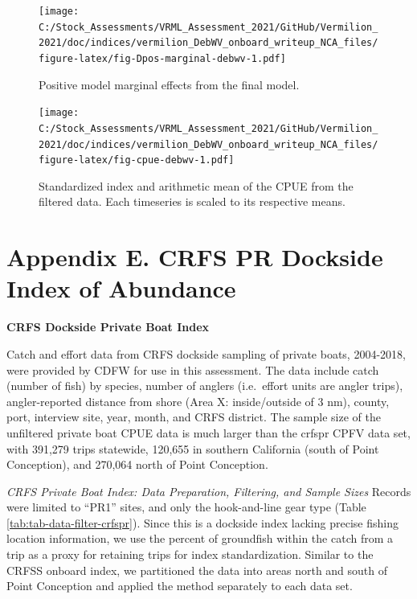 \documentclass[11pt,
  english,
]{article}
\begin{document}
\begin{figure}
\centering
\texttt{[image: C:/Stock\_Assessments/VRML\_Assessment\_2021/GitHub/Vermilion\_2021/doc/indices/vermilion\_DebWV\_onboard\_writeup\_NCA\_files/figure-latex/fig-Dpos-marginal-debwv-1.pdf]}
\caption{\label{fig:fig-Dpos-marginal-debwv}Positive model marginal effects from the final model.}
\end{figure}

\begin{figure}
\centering
\texttt{[image: C:/Stock\_Assessments/VRML\_Assessment\_2021/GitHub/Vermilion\_2021/doc/indices/vermilion\_DebWV\_onboard\_writeup\_NCA\_files/figure-latex/fig-cpue-debwv-1.pdf]}
\caption{\label{fig:fig-cpue-debwv}Standardized index and arithmetic mean of the CPUE from the filtered data. Each timeseries is scaled to its respective means.}
\end{figure}

\newpage


\hypertarget{appendix-e.-crfs-pr-dockside-index-of-abundance}{%
\section*{Appendix E. CRFS PR Dockside Index of Abundance}\label{appendix-e.-crfs-pr-dockside-index-of-abundance}}

\leavevmode\tagmcend\tagstructend

\renewcommand{\thepage}{E\arabic{page}}
\renewcommand{\thefigure}{E\arabic{figure}}
\renewcommand{\thetable}{E\arabic{table}}
\setcounter{page}{1}
\setcounter{figure}{0}
\setcounter{table}{0}

\textbf{CRFS Dockside Private Boat Index}

Catch and effort data from CRFS dockside sampling of private boats, 2004-2018, were provided by CDFW for use in this assessment. The data include catch (number of fish) by species, number of anglers (i.e.~effort units are angler trips), angler-reported distance from shore (Area X: inside/outside of 3 nm), county, port, interview site, year, month, and CRFS district. The sample size of the unfiltered private boat CPUE data is much larger than the crfspr CPFV data set, with 391,279 trips statewide, 120,655 in southern California (south of Point Conception), and 270,064 north of Point Conception.

\emph{CRFS Private Boat Index: Data Preparation, Filtering, and Sample Sizes} Records were limited to ``PR1'' sites, and only the hook-and-line gear type (Table \ref{tab:tab-data-filter-crfspr}). Since this is a dockside index lacking precise fishing location information, we use the percent of groundfish within the catch from a trip as a proxy for retaining trips for index standardization. Similar to the CRFSS onboard index, we partitioned the data into areas north and south of Point Conception and applied the method separately to each data set.
\end{document}
